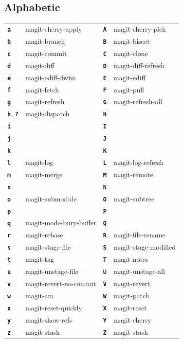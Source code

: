 \documentclass[9pt]{extarticle}
\newcommand{\kbd}[1]{\texttt{\textbf{#1}}}
\begin{document}
\begin{multicols}{3}
  \subsection*{Alphabetic}
  \begin{tabular}{L{0.10} L{0.45} L{0.10} L{0.45}}
    \kbd{a} & magit-cherry-apply     & \kbd{A} & magit-cherry-pick \\
    \kbd{b} & magit-branch           & \kbd{B} & magit-bisect \\
    \kbd{c} & magit-commit           & \kbd{C} & magit-clone \\
    \kbd{d} & magit-diff             & \kbd{D} & magit-diff-refresh \\
    \kbd{e} & magit-ediff-dwim       & \kbd{E} & magit-ediff \\
    \kbd{f} & magit-fetch            & \kbd{F} & magit-pull \\
    \kbd{g} & magit-refresh          & \kbd{G} & magit-refresh-all \\
    \kbd{h}, \kbd{?} & magit-dispatch & \kbd{H} &  \\
    \kbd{i} &                        & \kbd{I} &  \\
    \kbd{j} &                        & \kbd{J} &  \\
    \kbd{k} &                        & \kbd{K} &  \\
    \kbd{l} & magit-log              & \kbd{L} & magit-log-refresh \\
    \kbd{m} & magit-merge            & \kbd{M} & magit-remote \\
    \kbd{n} &                        & \kbd{N} &  \\
    \kbd{o} & magit-submodule        & \kbd{O} & magit-subtree \\
    \kbd{p} &                        & \kbd{P} &  \\
    \kbd{q} & magit-mode-bury-buffer & \kbd{Q} &  \\
    \kbd{r} & magit-rebase           & \kbd{R} & magit-file-rename \\
    \kbd{s} & magit-stage-file       & \kbd{S} & magit-stage-modified \\
    \kbd{t} & magit-tag              & \kbd{T} & magit-notes \\
    \kbd{u} & magit-unstage-file     & \kbd{U} & magit-unstage-all \\
    \kbd{v} & magit-revert-no-commit & \kbd{V} & magit-revert \\
    \kbd{w} & magit-am               & \kbd{W} & magit-patch \\
    \kbd{x} & magit-reset-quickly    & \kbd{X} & magit-reset \\
    \kbd{y} & magit-show-refs        & \kbd{Y} &  magit-cherry \\
     \kbd{z} & magit-stash            & \kbd{Z} & magit-stash \\
  \end{tabular}


\end{multicols}
\end{document}
